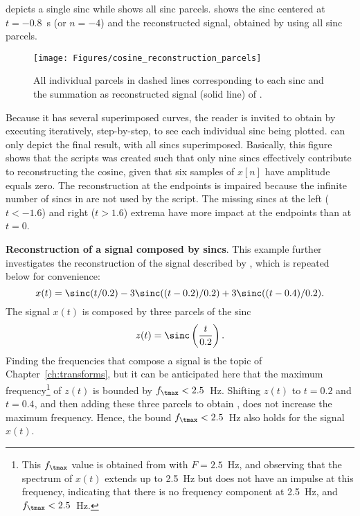  depicts a single sinc while  shows all sinc parcels.  shows the sinc centered at $t=-0.8$~s (or $n=-4$) and the reconstructed signal, obtained by using all sinc parcels.

\begin{figure}
	\centering
		\texttt{[image: Figures/cosine\_reconstruction\_parcels]}		
	\caption{All individual parcels in dashed lines corresponding to each sinc and the summation
	as reconstructed signal (solid line) of .\label{fig:cosine_reconstruction_parcels}}
\end{figure}

Because it has several superimposed curves, the reader is invited to obtain  by executing  iteratively, step-by-step, to see each individual sinc being plotted.  can only depict the final result, with all sincs superimposed.
Basically, this figure shows that the scripts was created such that only nine sincs effectively contribute to reconstructing the cosine, given that six samples of $x[n]$ have amplitude equals zero. The reconstruction at the endpoints is impaired because the infinite number of sincs in  are not used by the script. The missing sincs at the left ($t < -1.6$) and right ($t > 1.6$) extrema have more impact at the endpoints than at $t=0$.
\eExample

\bExample \textbf{Reconstruction of a signal composed by sincs}.
This example further investigates the reconstruction of the signal described by , which is
repeated below for convenience:
\[
x(t) = \sinc(t/0.2) - 3\sinc((t-0.2)/0.2) + 3 \sinc((t-0.4)/0.2).
\]
The signal $x(t)$ is composed by three parcels of the sinc
\[
z(t) = \sinc \left( \frac{t}{0.2} \right).
\]
Finding the frequencies that compose a signal is the topic of Chapter~\ref{ch:transforms}, but it can be anticipated
here that the maximum frequency\footnote{This $f_\tmax$ value is obtained from  with $F=2.5$~Hz, and observing that the spectrum of $x(t)$ extends up to 2.5~Hz but does not have an impulse at this frequency, indicating that there is no frequency component at 2.5~Hz, and $f_\tmax < 2.5$~Hz.} of $z(t)$ is bounded by $f_\tmax < 2.5$~Hz. Shifting $z(t)$ to $t=0.2$ and $t=0.4$, and then adding these three parcels to obtain , does not increase the
maximum frequency. Hence, the bound $f_\tmax < 2.5$~Hz also holds for the signal $x(t)$.

